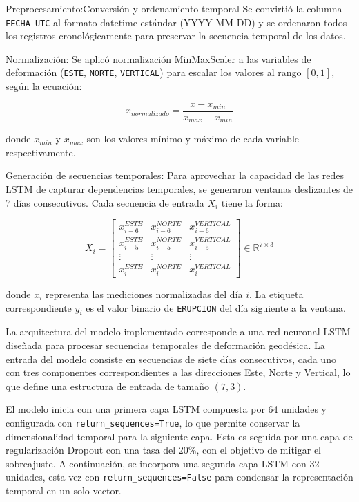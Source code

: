 \documentclass[conference]{IEEEtran}
\begin{document}
Preprocesamiento:Conversión y ordenamiento temporal
Se convirtió la columna \texttt{FECHA\_UTC} al formato datetime estándar (YYYY-MM-DD) y se ordenaron todos los registros cronológicamente para preservar la secuencia temporal de los datos.

Normalización: Se aplicó normalización MinMaxScaler a las variables de deformación (\texttt{ESTE}, \texttt{NORTE}, \texttt{VERTICAL}) para escalar los valores al rango $[0,1]$, según la ecuación:

\begin{equation}
    x_{normalizado} = \frac{x - x_{min}}{x_{max} - x_{min}}
\end{equation}

donde $x_{min}$ y $x_{max}$ son los valores mínimo y máximo de cada variable respectivamente.

Generación de secuencias temporales: Para aprovechar la capacidad de las redes LSTM de capturar dependencias temporales, se generaron ventanas deslizantes de 7 días consecutivos. Cada secuencia de entrada $X_i$ tiene la forma:

\begin{equation}
    X_i = \begin{bmatrix}
        x_{i-6}^{ESTE} & x_{i-6}^{NORTE} & x_{i-6}^{VERTICAL} \\
        x_{i-5}^{ESTE} & x_{i-5}^{NORTE} & x_{i-5}^{VERTICAL} \\
        \vdots & \vdots & \vdots \\
        x_{i}^{ESTE} & x_{i}^{NORTE} & x_{i}^{VERTICAL}
    \end{bmatrix} \in \mathbb{R}^{7 \times 3}
\end{equation}

donde $x_i$ representa las mediciones normalizadas del día $i$. La etiqueta correspondiente $y_i$ es el valor binario de \texttt{ERUPCION} del día siguiente a la ventana.

La arquitectura del modelo implementado corresponde a una red neuronal LSTM diseñada para procesar secuencias temporales de deformación geodésica. La entrada del modelo consiste en secuencias de siete días consecutivos, cada uno con tres componentes correspondientes a las direcciones Este, Norte y Vertical, lo que define una estructura de entrada de tamaño $(7, 3)$.

El modelo inicia con una primera capa LSTM compuesta por 64 unidades y configurada con \texttt{return\_sequences=True}, lo que permite conservar la dimensionalidad temporal para la siguiente capa. Esta es seguida por una capa de regularización Dropout con una tasa del 20\%, con el objetivo de mitigar el sobreajuste. A continuación, se incorpora una segunda capa LSTM con 32 unidades, esta vez con \texttt{return\_sequences=False} para condensar la representación temporal en un solo vector.
\end{document}
